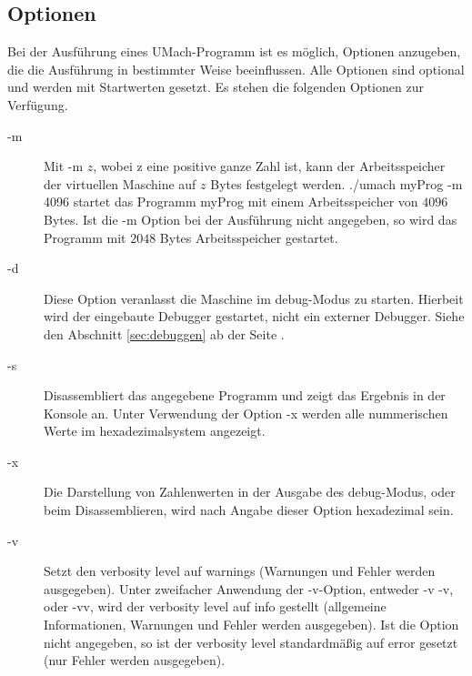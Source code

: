 \subsection{Optionen}
Bei der Ausführung eines UMach-Programm ist es möglich, Optionen anzugeben, die
die Ausführung in bestimmter Weise beeinflussen. Alle Optionen sind optional und
werden mit Startwerten gesetzt. Es stehen die folgenden Optionen zur Verfügung.
\begin{description}
\item[-m]
Mit \glqq{}-m $z$\grqq{}, wobei \glqq{}z\grqq{} eine positive ganze Zahl ist,
kann der Arbeitsspeicher der virtuellen Maschine auf $z$ Bytes festgelegt
werden. \glqq{}./umach myProg -m 4096\grqq{} startet das Programm
\glqq{}myProg\grqq{} mit einem Arbeitsspeicher von $4096$ Bytes. Ist die
\glqq{}-m\grqq{} Option bei der Ausführung nicht angegeben, so wird das Programm
mit $2048$ Bytes Arbeitsspeicher gestartet.

\item[-d]
Diese Option veranlasst die Maschine im \glqq{}debug\grqq{}-Modus zu starten.
Hierbeit wird der eingebaute Debugger gestartet, nicht ein externer Debugger.
Siehe den Abschnitt \ref{sec:debuggen} ab der Seite \pageref{sec:debuggen}.

\item[-s]
Disassembliert das angegebene Programm und zeigt das Ergebnis in der Konsole an.
Unter Verwendung der Option -x werden alle nummerischen Werte im
hexadezimalsystem angezeigt.

\item[-x]
Die Darstellung von Zahlenwerten in der Ausgabe des \glqq{}debug\grqq{}-Modus,
oder beim Disassemblieren, wird nach Angabe dieser Option hexadezimal sein.

\item[-v]
Setzt den \glqq{}verbosity level\grqq{} auf \glqq{}warnings\grqq{} (Warnungen
und Fehler werden ausgegeben). Unter zweifacher Anwendung der
\glqq{}-v\grqq{}-Option, entweder \glqq{}-v -v\grqq{}, oder \glqq{}-vv\grqq{},
wird der \glqq{}verbosity level\grqq{} auf \glqq{}info\grqq{} gestellt
(allgemeine Informationen, Warnungen und Fehler werden ausgegeben). Ist die
Option nicht angegeben, so ist der \glqq{}verbosity level\grqq{} standardmäßig
auf \glqq{}error\grqq{} gesetzt (nur Fehler werden ausgegeben).


\end{description}

